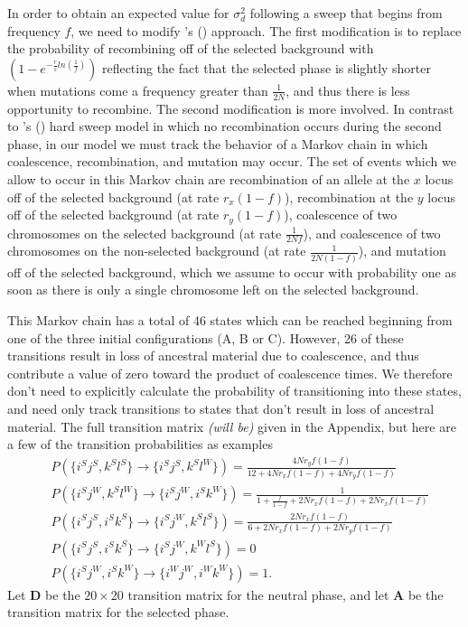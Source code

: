 \documentclass[a4paper,10pt]{article}
\newcommand{\jb}[1]{{\it\color{blue} (#1)} }
\def\citeapos#1{\citeauthor{#1}'s (\citeyear{#1})}
\begin{document}
In order to obtain an expected value for $\sigma_d^2$ following a sweep that begins from frequency $f$, we need to modify \citeapos{McVean:2006ke} approach. The first modification is to replace the probability of recombining off of the selected background with $(1 - e^{-\frac{r}{s}ln(\frac{1}{f})})$ reflecting the fact that the selected phase is slightly shorter when mutations come a frequency greater than $\frac{1}{2N}$, and thus there is less opportunity to recombine. The second modification is more involved. In contrast to \citeapos{McVean:2006ke} hard sweep model in which no recombination occurs during the second phase, in our model we must track the behavior of a Markov chain in which coalescence, recombination, and mutation may occur. The set of events which we allow to occur in this Markov chain are recombination of an allele at the $x$ locus off of the selected background (at rate $r_x\left(1-f\right)$), recombination at the $y$ locus off of the selected background (at rate $r_y\left(1-f\right)$), coalescence of two chromosomes on the selected background (at rate $\frac{1}{2Nf}$), and coalescence of two chromosomes on the non-selected background (at rate $\frac{1}{2N\left(1-f\right)}$), and mutation off of the selected background, which we assume to occur with probability one as soon as there is only a single chromosome left on the selected background.

This Markov chain has a total of 46 states which can be reached beginning from one of the three initial configurations (A, B or C). However, 26 of these transitions result in loss of ancestral material due to coalescence, and thus contribute a value of zero toward the product of coalescence times. We therefore don't need to explicitly calculate the probability of transitioning into these states, and need only track transitions to states that don't result in loss of ancestral material. The full transition matrix \jb{will be} given in the Appendix, but here are a few of the transition probabilities as examples
\begin{align}
	&P\left(\{i^Sj^S,k^Sl^S\} \rightarrow \{i^Sj^S,k^Sl^W\}\right) = \frac{4Nr_y f\left(1-f\right)}{12 + 4Nr_x f\left(1-f\right) + 4Nr_y f\left(1-f\right)} \\
	&P\left(\{i^Sj^W,k^Sl^W\} \rightarrow \{i^Sj^W,i^Sk^W\}\right) = \frac{1}{1 + \frac{f}{1-f} + 2Nr_x f\left(1-f\right) + 2Nr_x f\left(1-f\right)} \\
	&P\left(\{i^Sj^S,i^Sk^S\} \rightarrow \{i^Sj^W,k^Sl^S\}\right) = \frac{2Nr_x f\left(1-f\right)}{6 + 2Nr_x f\left(1-f\right) + 2Nr_y f\left(1-f\right)} \\
	&P\left(\{i^Sj^S,i^Sk^S\} \rightarrow \{i^Sj^W,k^Wl^S\}\right) = 0 \\
	&P\left(\{i^Sj^W,i^Sk^W\} \rightarrow \{i^Wj^W,i^Wk^W\}\right) = 1.
\end{align}
Let $\mathbf{D}$ be the $20\times 20$ transition matrix for the neutral phase, and let $\mathbf{A}$ be the transition matrix for the selected phase. 
\end{document}
